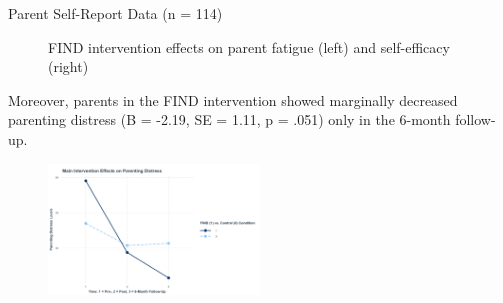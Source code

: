 \documentclass[final]{beamer}
\newlength{\colwidth}
\begin{document}
\begin{frame}[t]
\begin{columns}[t]
\begin{column}{\colwidth}
\begin{block}{Parent Self-Report Data (n = 114)}
    \begin{figure}[ht]
        \centering
        \caption{FIND intervention effects on parent fatigue (left) and self-efficacy (right)}
        \label{fig:combined}
    \end{figure} 
    
    Moreover, parents in the FIND intervention showed marginally decreased parenting distress (B = -2.19, SE = 1.11, p = .051) only in the 6-month follow-up. 
    
    \begin{figure}[ht]
        \centering
          \includegraphics[clip, width=0.5\textwidth]{distress.png}
          \label{fig:distress}
    \end{figure}
    

\end{block}
\end{column}
\end{columns}
\end{frame}
\end{document}
